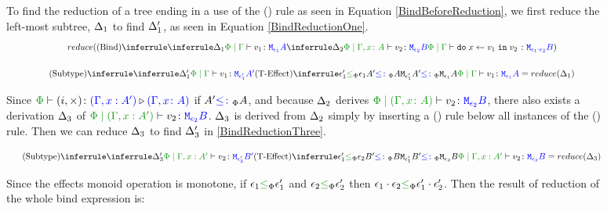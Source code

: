 \documentclass{Report}
\begin{document}
\begin{figure}[H]
\begin{framed}
    \case{\vbind}

    To find the reduction of a tree ending in a use of the (\textit{\vbind}) rule as seen in Equation \ref{BindBeforeReduction}, we first reduce the left-most subtree, $\Delta_1$ to find $\Delta_1'$, as seen in Equation \ref{BindReductionOne}.
    \begin{equation}\label{BindBeforeReduction}
        \scalebox{.8}{$
        \reduce(
            \ntreeruleII{\vbind}{
                \treeruleI{
                    \D_1
                }{
                    \gpetyperelation{v_1}{\M{\e_1}{A}}
                }
            }{
                \treeruleI{
                    \D_2
                }{
                    \etyperelation{\P}{\gax}{v_2}{\M{\e_2}{B}}
                }
            } {
                \gpetyperelation{\doin{x}{v_1}{v_2}}{\M{\e_1\dot\e_2}{B}}
            }
        )
        $}
    \end{equation}


    \begin{equation}\label{BindReductionOne}
        \scalebox{.8}{$
        \ntreeruleII{\vsubtype}{
            \treeruleI{\D'_1}{\gpetyperelation{v_1}{\M{\e'_1}{A'}}}
        }{
        \subeffecttreep{\e_1'}{A'}{\e_1}{A}
        }{
            \gpetyperelation{v_1}{\M{\e_1}{A}}
        } = \reduce(\D_1)
        $}
    \end{equation}

    Since $\ewrel{\P}{(i,\x)}{(\G, x: A')}{(\gax)}$ if $A' {\color{blue} \leq\colon}_\Phi A$, and because $\Delta_2$ derives $\etyperelation{\P}{(\gax)}{v_2}{\M{\e_2}{B}}$, there also exists a derivation $\Delta_3$ of $\etyperelation{\P}{(\G, x: A')}{v_2}{\M{\e_2}{B}}$. $\Delta_3$ is derived from $\Delta_2$ simply by inserting a (\textit{\vsubtype}) rule below all instances of the (\textit{\vvar}) rule. Then we can reduce $\Delta_3$ to find $\Delta_3'$ in \ref{BindReductionThree}.

    \begin{equation}\label{BindReductionThree}
        \scalebox{.8}{$
        \ntreeruleII{\vsubtype}{
            \treeruleI{\D'_3}{\etyperelation{\P}{\G, x: A'}{v_2}{\M{\e'_2}{B'}}}
        }{
        \subeffecttreep{\e_1'}{B'}{\e_2}{B}
        }{
            \etyperelation{\P}{\G, x: A'}{v_2}{\M{\e_2}{B}}
        } = \reduce(\D_3)
        $}
    \end{equation}
    

    Since the effects monoid operation is monotone, if $\e_1\subeffectp\e_1'$ and $\e_2\subeffectp\e_2'$ then $\e_1\dot\e_2 \subeffectp \e_1'\dot\e_2'$. Then the result of reduction of the whole bind expression is:



\end{framed}
\end{figure}
\end{document}
